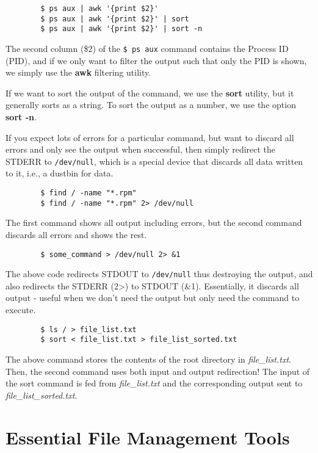 \documentclass{report}
\begin{document}
	\noindent
	\begin{verbatim}	
		$ ps aux | awk '{print $2}'
		$ ps aux | awk '{print $2}' | sort
		$ ps aux | awk '{print $2}' | sort -n
	\end{verbatim}
	
	\noindent
	The second column (\$2) of the \verb|$ ps aux| command contains the Process ID (PID), and if we only want to filter the output such that only the PID is shown, we simply use the \textbf{awk} filtering utility. 
	
	If we want to sort the output of the command, we use the \textbf{sort} utility, but it generally sorts as a string. To sort the output as a number, we use the option \textbf{sort -n}.
	
	\noindent
	If you expect lots of errors for a particular command, but want to discard all errors and only see the output when successful, then simply redirect the STDERR to \verb|/dev/null|, which is a special device that discards all data written to it, i.e., a dustbin for data. 
	
	\begin{verbatim}	
		$ find / -name "*.rpm"
		$ find / -name "*.rpm" 2> /dev/null
	\end{verbatim}
	
	\noindent
	The first command shows all output including errors, but the second command discards all errors and shows the rest. 	
	
	\begin{verbatim}
		$ some_command > /dev/null 2> &1
	\end{verbatim}
	
	\noindent
	The above code redirects STDOUT to \verb|/dev/null| thus destroying the output, and also redirects the STDERR (2>) to STDOUT (\&1). Essentially, it discards all output - useful when we don't need the output but only need the command to execute.
	
	\begin{verbatim}
		$ ls / > file_list.txt
		$ sort < file_list.txt > file_list_sorted.txt
	\end{verbatim}
	
	\noindent
	The above command stores the contents of the root directory in \textit{file\_list.txt}. Then, the second command uses both input and output redirection! The input of the sort command is fed from \textit{file\_list.txt} and the corresponding output sent to \textit{file\_list\_sorted.txt}.
	
	\chapter{Essential File Management Tools}
\end{document}
